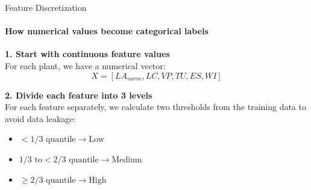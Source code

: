 \documentclass[aspectratio=169, 11pt]{beamer}
\begin{document}
\begin{frame}{Feature Discretization}
    \framesubtitle{How numerical values become categorical labels}

    \textbf{1. Start with continuous feature values} \\
    \footnotesize For each plant, we have a numerical vector:
    $$ X = [LA_{norm}, LC, VP, TU, ES, WI] $$
    
    \vspace{0.3cm}
    \normalsize\textbf{2. Divide each feature into 3 levels} \\
    \footnotesize For each feature separately, we calculate two thresholds from the training data to avoid data leakage:

    \vspace{0.4cm}
    \begin{center}
    \end{center}

    \vspace{0.2cm}
    \begin{itemize}\scriptsize
        \item $< \text{1/3 quantile} \rightarrow \text{Low}$
        \item $\text{1/3 to} < \text{2/3 quantile} \rightarrow \text{Medium}$
        \item $\geq \text{2/3 quantile} \rightarrow \text{High}$
    \end{itemize}
\end{frame}
\end{document}
